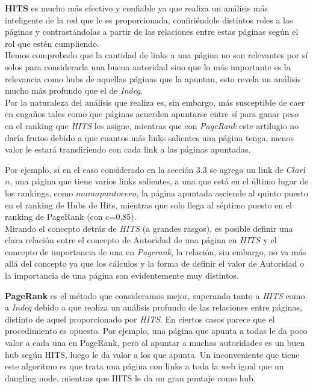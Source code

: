 \documentclass[a4paper]{article}
\begin{document}
\textbf{HITS} es mucho más efectivo y confiable ya que realiza un análisis más inteligente de la red que le es proporcionada, confiriéndole distintos roles a las páginas y contrastándolas a partir de las relaciones entre estas páginas según el rol que estén cumpliendo.\\
Hemos comprobado que la cantidad de links a una página no son relevantes por sí solos para considerarla una buena autoridad sino que lo más importante es la relevancia como hubs de aquellas páginas que la apuntan, esto revela un análisis mucho más profundo que el de \textit{Indeg}.\\
Por la naturaleza del análisis que realiza es, sin embargo, más susceptible de caer en engaños tales como que páginas acuerden apuntarse entre sí para ganar peso en el ranking que \textit{HITS} les asigne, mientras que con \textit{PageRank} este artilugio no daría frutos debido a que cuantos más links salientes una página tenga, menos valor le estará transfiriendo con cada link a las páginas apuntadas.

Por ejemplo, si en el caso considerado en la sección 3.3 se agrega un link de $Clar$í$n$, una página que tiene varios links salientes, a una que está en el último lugar de los rankings, como $mamapuntocero$, la página apuntada asciende al quinto puesto en el ranking de Hubs de Hits, mientras que solo llega al séptimo puesto en el ranking de PageRank (con c=0.85).\\ 

Mirando el concepto detrás de \textit{HITS} (a grandes rasgos), es posible definir una clara relación entre el concepto de Autoridad de una página en $HITS$ y el concepto de importancia de una en \textit{Pagerank}, la relación, sin embargo, no va más allá del concepto ya que los cálculos y la forma de definir el valor de Autoridad o la importancia de una página son evidentemente muy distintos.

\textbf{PageRank} es el método que consideramos mejor, superando tanto a \textit{HITS} como a \textit{Indeg} debido a que realiza un análisis profundo de las relaciones entre páginas, distinto de aquel proporcionado por \textit{HITS}. En ciertos casos parece que el procedimiento es opuesto. Por ejemplo, una página que apunta a todas le da poco valor a cada una en PageRank, pero al apuntar a muchas autoridades es un buen hub según HITS, luego le da valor a los que apunta. Un inconveniente que tiene este algoritmo es que trata una página con links a toda la web igual que un dangling node, mientras que HITS le da un gran puntaje como hub.
\\ 
\end{document}
